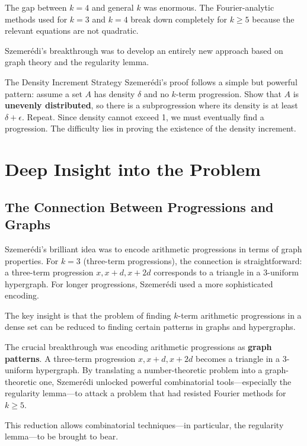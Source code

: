 The gap between $k=4$ and general $k$ was enormous. The Fourier-analytic methods used for $k=3$ and $k=4$ break down completely for $k \geq 5$ because the relevant equations are not quadratic.

Szemer\'edi's breakthrough was to develop an entirely new approach based on graph theory and the regularity lemma.

\begin{primer}{The Density Increment Strategy}
Szemer\'edi's proof follows a simple but powerful pattern: assume a set $A$ has density $\delta$ and no $k$-term progression. Show that $A$ is \textbf{unevenly distributed}, so there is a subprogression where its density is at least $\delta + \epsilon$. Repeat. Since density cannot exceed 1, we must eventually find a progression. The difficulty lies in proving the existence of the density increment.
\end{primer}

\section{Deep Insight into the Problem}

\subsection{The Connection Between Progressions and Graphs}

Szemer\'edi's brilliant idea was to encode arithmetic progressions in terms of graph properties. For $k=3$ (three-term progressions), the connection is straightforward: a three-term progression $x, x+d, x+2d$ corresponds to a triangle in a 3-uniform hypergraph. For longer progressions, Szemer\'edi used a more sophisticated encoding.

The key insight is that the problem of finding $k$-term arithmetic progressions in a dense set can be reduced to finding certain patterns in graphs and hypergraphs.

\begin{bigidea}
The crucial breakthrough was encoding arithmetic progressions as \textbf{graph patterns}. A three-term progression $x, x+d, x+2d$ becomes a triangle in a 3-uniform hypergraph. By translating a number-theoretic problem into a graph-theoretic one, Szemer\'edi unlocked powerful combinatorial tools---especially the regularity lemma---to attack a problem that had resisted Fourier methods for $k \geq 5$.
\end{bigidea} This reduction allows combinatorial techniques---in particular, the regularity lemma---to be brought to bear.

